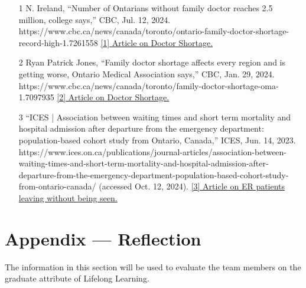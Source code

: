 \documentclass[12pt]{article}
\begin{document}
\begin{itemize}
  \item
  [1]N. Ireland, “Number of Ontarians without family doctor reaches 2.5 million, college says,” CBC, Jul. 12, 2024. https://www.cbc.ca/news/canada/toronto/ontario-family-doctor-shortage-record-high-1.7261558
  \href{https://www.cbc.ca/news/canada/toronto/ontario-family-doctor-shortage-record-high-1.7261558}{[1] Article on Doctor Shortage.}
  \item 
  [2]Ryan Patrick Jones, “Family doctor shortage affects every region and is getting worse, Ontario Medical Association says,” CBC, Jan. 29, 2024. https://www.cbc.ca/news/canada/toronto/family-doctor-shortage-oma-1.7097935
  \href{https://www.cbc.ca/news/canada/toronto/family-doctor-shortage-oma-1.7097935}{[2] Article on Doctor Shortage.}
  \item
  [3]“ICES | Association between waiting times and short term mortality and hospital admission after departure from the emergency department: population-based cohort study from Ontario, Canada,” ICES, Jun. 14, 2023. https://www.ices.on.ca/publications/journal-articles/association-between-waiting-times-and-short-term-mortality-and-hospital-admission-after-departure-from-the-emergency-department-population-based-cohort-study-from-ontario-canada/ (accessed Oct. 12, 2024).
  \href{https://www.ices.on.ca/publications/journal-articles/association-between-waiting-times-and-short-term-mortality-and-hospital-admission-after-departure-from-the-emergency-department-population-based-cohort-study-from-ontario-canada/}{[3] Article on ER patients leaving without being seen.}
\end{itemize}

\newpage{}
\section*{Appendix --- Reflection}


The information in this section will be used to evaluate the team members on the
graduate attribute of Lifelong Learning.  


\end{document}
